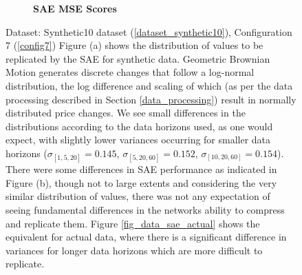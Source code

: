 \documentclass[a4paper,11pt,oneside]{article}
\theoremstyle{plain}
\theoremstyle{definition}
\begin{document}
\begin{figure}[H]
\begin{subfigure}{.99\textwidth}
			\caption{\textbf{SAE MSE Scores} 
				\newline }
			\label{figure-test_aggregation_mse}
		\end{subfigure}
		\caption[SAE MSE Scores for Synthetic Data]
		{Dataset: Synthetic10 dataset (\ref{dataset_synthetic10}), Configuration 7 (\ref{config7})
			\newline Figure (a) shows the distribution of values to be replicated by the SAE for synthetic data. Geometric Brownian Motion generates discrete changes that follow a log-normal distribution, the log difference and scaling of which (as per the data processing described in Section \ref{data_processing}) result in normally distributed price changes. We see small differences in the distributions according to the data horizons used, as one would expect, with slightly lower variances occurring for smaller data horizons ($\sigma_{[1,5,20]} = 0.145$, $\sigma_{[5,20,60]} = 0.152$, $\sigma_{[10,20,60]} = 0.154$). There were some differences in SAE performance as indicated in Figure (b), though not to large extents and considering the very similar distribution of values, there was not any expectation of seeing fundamental differences in the networks ability to compress and replicate them. 
			\newline Figure \ref{fig_data_sae_actual} shows the equivalent for actual data, where there is a significant difference in variances for longer data horizons which are more difficult to replicate.}
		\label{figure-data_sae_synthetic}
	\end{figure}
	
	
	
\end{document}
